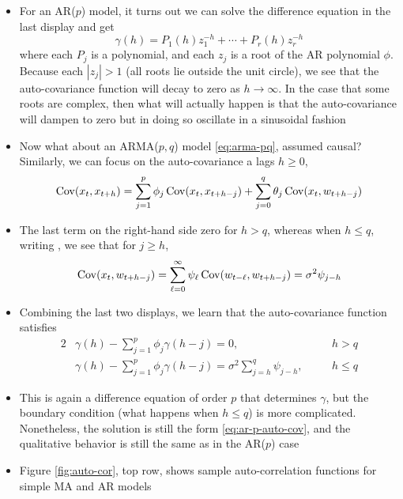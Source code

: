 \documentclass{article}
\begin{document}
\begin{itemize}
\item For an AR($p$) model, it turns out we can solve the difference equation in
  the 
  last display and get
  \begin{equation}
  \label{eq:ar-p-auto-cov}
  \gamma(h) = P_1(h) z_1^{-h} + \cdots + P_r(h) z_r^{-h}
  \end{equation}
  where each $P_j$ is a polynomial, and each $z_j$ is a root of the AR
  polynomial $\phi$. Because each $|z_j| > 1$ (all roots lie outside the unit
  circle), we see that the auto-covariance function will decay to zero as $h \to
  \infty$. In the case that some roots are complex, then what will actually 
  happen is that the auto-covariance will dampen to zero but in doing so
  oscillate in a sinusoidal fashion

\item Now what about an ARMA($p,q$) model \eqref{eq:arma-pq}, assumed
  causal? Similarly, we can focus on the auto-covariance a lags $h \geq 0$, 
  \[
  \operatorname{Cov}(x_t, x_{t+h}) = \sum_{j=1}^p \phi_j \operatorname{Cov}(x_t, x_{t+h-j}) + \sum_{j=0}^q 
  \theta_j \operatorname{Cov}(x_t, w_{t+h-j})  
  \]

\item The last term on the right-hand side zero for $h>q$, whereas when $h \leq
  q$, writing , we see
  that for $j \geq h$, 
  \[
  \operatorname{Cov}(x_t, w_{t+h-j}) = \sum_{\ell=0}^\infty \psi_\ell \operatorname{Cov}(w_{t-\ell},
  w_{t+h-j}) = \sigma^2 \psi_{j-h}   
  \]

\item Combining the last two displays, we learn that the auto-covariance
  function satisfies 
  \begin{alignat*}{2}
  &\gamma(h) - \sum_{j=1}^p \phi_j \gamma(h-j) = 0, \quad &&h > q \\ 
  &\gamma(h) - \sum_{j=1}^p \phi_j \gamma(h-j) = \sigma^2 \sum_{j=h}^q
    \psi_{j-h}, \quad &&h \leq q
  \end{alignat*}

\item This is again a difference equation of order $p$ that determines $\gamma$,
  but the boundary condition (what happens when $h \leq q$) is more
  complicated. Nonetheless, the solution is still the form
  \eqref{eq:ar-p-auto-cov}, and the qualitative behavior is still the same as in
  the AR($p$) case   

\item Figure \ref{fig:auto-cor}, top row, shows sample auto-correlation
  functions for simple MA and AR models 


\end{itemize}
\end{document}
